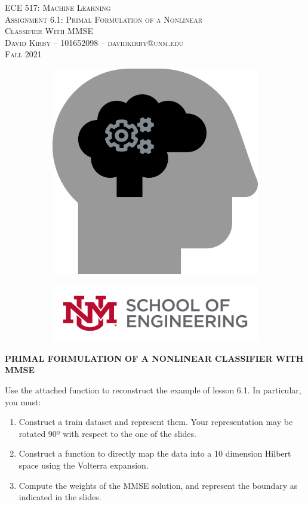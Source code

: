 \documentclass[11pt]{article}
\begin{document}
\setmainfont{SF Pro Text}
\setsansfont{SF Pro Text}
\setmonofont{SF Mono}
\renewcommand{\familydefault}{\sfdefault}

\thispagestyle{empty}
\begin{titlepage}
\vspace*{\fill}
\begin{center}
\textsc{\Huge{ECE 517: Machine Learning}}\\[3em]
\textsc{\LARGE Assignment 6.1: Primal Formulation of a Nonlinear\\[0.5em]Classifier With MMSE}\\[6em]
\textsc{\Large David Kirby -- 101652098 -- davidkirby@unm.edu}\\[3em]
\textsc{\Large Fall 2021}
\end{center}
\vfill
\begin{figure}[h]
\begin{subfigure}{0.5\textwidth}
\includegraphics[width=0.25\linewidth]{learning.png}
\end{subfigure}
\begin{subfigure}{0.6\textwidth}\hspace{1em}
\includegraphics[width=0.8\linewidth]{new-soe-logo.png}
\end{subfigure}
\end{figure}
\end{titlepage}
\setcounter{figure}{0}

\hypersetup{
    linkcolor=CrispBlue,
    urlcolor=CrispBlue,
    breaklinks=true
}

\textbf{PRIMAL FORMULATION OF A NONLINEAR CLASSIFIER WITH MMSE}

Use the attached function to reconstruct the example of lesson 6.1. In particular, you must:

\begin{enumerate}
    \item Construct a train dataset and represent them. Your representation may be rotated 90º with respect to the one of the slides.
    \item Construct a function to directly map the data into a 10 dimension Hilbert space using the Volterra expansion.
    \item Compute the weights of the MMSE solution, and represent the boundary as indicated in the slides.
\end{enumerate}
\end{document}
